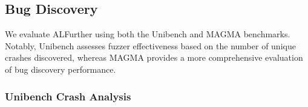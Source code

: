 \documentclass[lettersize,journal]{IEEEtran}
\begin{document}
\subsection{Bug Discovery}

We evaluate ALFurther using both the Unibench and MAGMA benchmarks. Notably, Unibench assesses fuzzer effectiveness based on the number of unique crashes discovered, whereas MAGMA provides a more comprehensive evaluation of bug discovery performance.


\subsubsection{Unibench Crash Analysis}
\begin{figure}[t!]
		\\

\end{figure}
\end{document}
